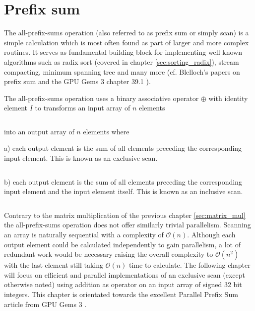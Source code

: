 \section{Prefix sum}
\label{sec:prefix_sum}

The all-prefix-sums operation (also referred to as prefix sum or simply scan) is a simple calculation which is most often found as part of larger and more complex routines. It serves as fundamental building block for implementing well-known algorithms such as radix sort (covered in chapter \ref{sec:sorting_radix}), stream compacting, minimum spanning tree and many more (cf. Blelloch's papers on prefix sum \cite{scan_blelloch_examples} \cite{scan_blelloch} and the GPU Gems 3 chapter 39.1 \cite{gpu_gems_3_chapter_39}).

The all-prefix-sums operation uses a binary associative operator $\oplus$ with identity element $I$ to transforms an input array of $n$ elements

\begin{equation*}
[a_0, a_1, \dots, a_{n-1}]
\end{equation*}

into an output array of $n$ elements where

a) each output element is the sum of all elements preceding the corresponding input element. This is known as an exclusive scan. \cite{gpu_gems_3_chapter_39}

\begin{equation*}
[I, a_0, (a_0 \oplus a_1), \dots, (a_0 \oplus a_1 \oplus \dots \oplus a_{n-2})]
\end{equation*}

b) each  output element is the sum of all elements preceding the corresponding input element and the input element itself. This is known as an inclusive scan. \cite{gpu_gems_3_chapter_39}

\begin{equation*}
[a_0, (a_0 \oplus a_1), \dots, (a_0 \oplus a_1 \oplus \dots \oplus a_{n-1})]
\end{equation*}

Contrary to the matrix multiplication of the previous chapter \ref{sec:matrix_mul} the all-prefix-sums operation does not offer similarly trivial parallelism. Scanning an array is naturally sequential with a complexity of $\mathcal{O}(n)$. Although each output element could be calculated independently to gain parallelism, a lot of redundant work would be necessary raising the overall complexity to $\mathcal{O}(n^2)$ with the last element still taking $\mathcal{O}(n)$ time to calculate.
The following chapter will focus on efficient and parallel implementations of an exclusive scan (except otherwise noted) using addition as operator on an input array of signed 32 bit integers. This chapter is orientated towards the excellent Parallel Prefix Sum article from GPU Gems 3 \cite{gpu_gems_3_chapter_39}.


